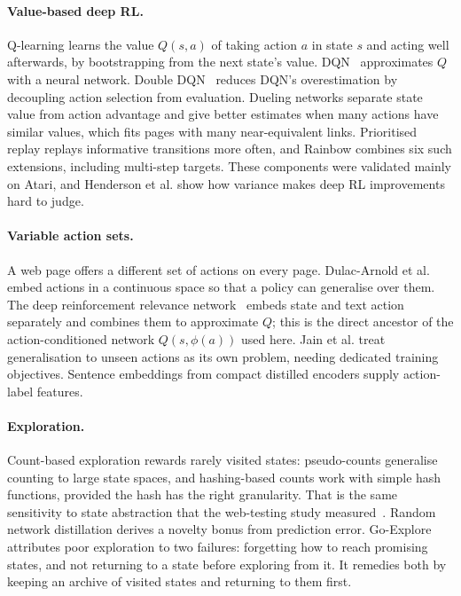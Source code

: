 \paragraph{Value-based deep RL.} Q-learning learns the value
$Q(s,a)$ of taking action $a$ in state $s$ and acting well afterwards, by bootstrapping
from the next state's value. DQN~\cite{mnih2015human}
approximates $Q$ with a neural network. Double DQN~\cite{vanhasselt2016double} reduces
DQN's overestimation by decoupling action selection from evaluation. Dueling
networks separate state value from action advantage and give better
estimates when many actions have similar values, which fits pages with many near-equivalent
links. Prioritised replay replays informative transitions more
often, and Rainbow combines six such extensions, including
multi-step targets. These components were validated mainly on Atari, and Henderson
et al. show how variance makes deep RL improvements hard to
judge.

\paragraph{Variable action sets.} A web page offers a different set of actions on every
page. Dulac-Arnold et al. embed actions in a continuous space so
that a policy can generalise over them. The deep reinforcement relevance
network~\cite{he2016drrn} embeds state and text action separately and combines them to
approximate $Q$; this is the direct ancestor of the action-conditioned network
$Q(s,\phi(a))$ used here. Jain et al. treat generalisation to
unseen actions as its own problem, needing dedicated training objectives. Sentence
embeddings from compact distilled encoders
supply action-label features.

\paragraph{Exploration.} Count-based exploration rewards rarely visited states:
pseudo-counts generalise counting to large state spaces, and
hashing-based counts work with simple hash functions, provided
the hash has the right granularity. That is the same sensitivity to state abstraction that
the web-testing study measured~\cite{liu2026webgui}. Random network
distillation derives a novelty bonus from prediction error.
Go-Explore~\cite{ecoffet2021first} attributes poor exploration to two failures: forgetting
how to reach promising states, and not returning to a state before exploring from it. It
remedies both by keeping an archive of visited states and returning to them first.

